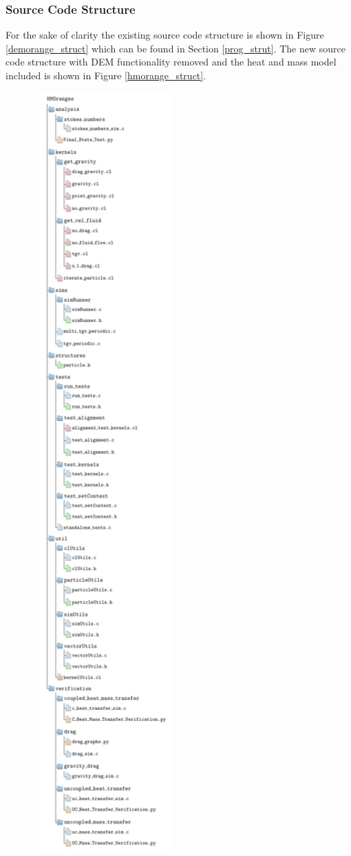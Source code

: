 \documentclass[../Interim_Report_Master]{subfiles}
\begin{document}
\subsubsection{Source Code Structure}
For the sake of clarity the existing source code structure is shown in Figure \ref{demorange_struct} which can be found in Section \ref{prog_strut}. The new source code structure with DEM functionality removed and the heat and mass model included is shown in Figure \ref{hmorange_struct}. 
\begin{figure}[H]
	\centering
	\includegraphics*[width=0.5\textwidth, trim=0 985 0 0, clip]{./Diagrams/HMOranges_Structure/HMOranges_Structure.pdf}
\end{figure}
\end{document}
